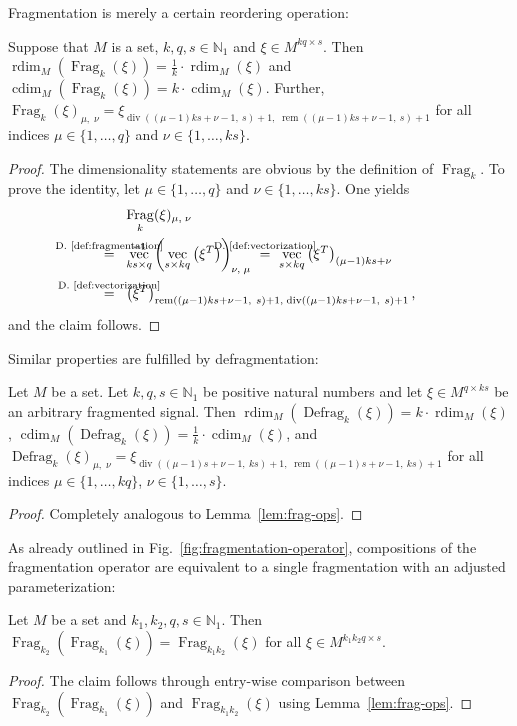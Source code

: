 \documentclass[journal]{IEEEtran}
\newcommand{\N}{\mathbb{N}}
\newcommand{\discint}[2]{\{#1,\dotsc,#2\}}
\newcommand{\inint}[2]{\in\discint{#1}{#2}}
\newcommand{\transp}{^T}
\DeclareMathOperator{\vect}{vec}
\DeclareMathOperator{\rdim}{rdim}
\DeclareMathOperator{\cdim}{cdim}
\DeclareMathOperator{\Fragmentation}{Frag}
\DeclareMathOperator{\Defragmentation}{Defrag}
\renewcommand{\div}[2]{\operatorname{div}(#1,\ #2)}
\newcommand{\rem}[2]{\operatorname{rem}(#1,\ #2)}
\newcommand{\equsing}[1]{\overset{\mathclap{\text{#1}}}{=}}
\begin{document}
Fragmentation is merely a certain reordering operation:
\begin{lemma}
\label{lem:frag-ops}
Suppose that $M$ is a set, $k,q,s\in\N_1$ and ${\xi\in M^{kq\times s}}$.
Then $\rdim_M(\Fragmentation_k(\xi)) = \frac{1}{k}\cdot\rdim_M(\xi)$ and $\cdim_M(\Fragmentation_k(\xi)) = k\cdot\cdim_M(\xi)$.
Further, $\Fragmentation_k(\xi)_{\mu,\;\nu} = \xi_{\div{ (\mu - 1)ks + \nu - 1}{s} + 1,\;\rem{ (\mu - 1)ks + \nu - 1}{s} + 1}$
for all indices $\mu\inint{1}{q}$ and $\nu\inint{1}{ks}$.
\end{lemma}
\begin{proof}
The dimensionality statements are obvious by the definition of $\Fragmentation_k$.
To prove the identity, let $\mu\inint{1}{q}$ and $\nu\inint{1}{ks}$.
One yields
\begin{align*}
     & \Fragmentation_k(\xi)_{\mu,\;\nu}\\
  \equsing{D.~\ref{def:fragmentation}}\ \ & \vect_{ks\times q}^{-1}\left( \vect_{s\times kq}\left(\xi\transp\right) \right)_{\nu,\;\mu}
  \ \equsing{D.~\ref{def:vectorization}}\ \vect_{s\times kq}\left(\xi\transp\right)_{(\mu - 1)ks + \nu}\\
  \equsing{D.~\ref{def:vectorization}}\ \ & \left(\xi\transp\right)_{\rem{ (\mu - 1)ks + \nu - 1}{s} + 1,\;\div{ (\mu - 1)ks + \nu - 1}{s} + 1}\text{,}
\end{align*}
and the claim follows.
\end{proof}

Similar properties are fulfilled by defragmentation:
\begin{lemma}
\label{lem:defrag-ops}
Let $M$ be a set.
Let $k,q,s\in\N_1$ be positive natural numbers and let $\xi\in M^{q\times ks}$ be an arbitrary fragmented signal.
Then $\rdim_M(\Defragmentation_k(\xi)) = k\cdot\rdim_M(\xi)$, $\cdim_M(\Defragmentation_k(\xi)) = \frac{1}{k}\cdot\cdim_M(\xi)$, and $\Defragmentation_k(\xi)_{\mu,\;\nu} = \xi_{\div{ (\mu - 1)s + \nu - 1}{ks} + 1,\;\rem{ (\mu - 1)s + \nu - 1}{ks} + 1}$
for all indices $\mu\inint{1}{kq}$, $\nu\inint{1}{s}$.
\end{lemma}
\begin{proof}
Completely analogous to Lemma~\ref{lem:frag-ops}.
\end{proof}

As already outlined in Fig.~\ref{fig:fragmentation-operator}, compositions of the fragmentation operator are equivalent to a single fragmentation with an adjusted parameterization:

\begin{remark}
\label{rem:comp-frag}
Let $M$ be a set and $k_1,k_2,q,s\in\N_1$.
Then $\Fragmentation_{k_2}(\Fragmentation_{k_1}(\xi)) = \Fragmentation_{k_1k_2}(\xi)$ for all $\xi\in M^{k_1k_2q\times s}$.
\end{remark}
\begin{proof}
The claim follows through entry-wise comparison between $\Fragmentation_{k_2}(\Fragmentation_{k_1}(\xi))$ and $\Fragmentation_{k_1k_2}(\xi)$ using Lemma~\ref{lem:frag-ops}.
\end{proof}
\end{document}
